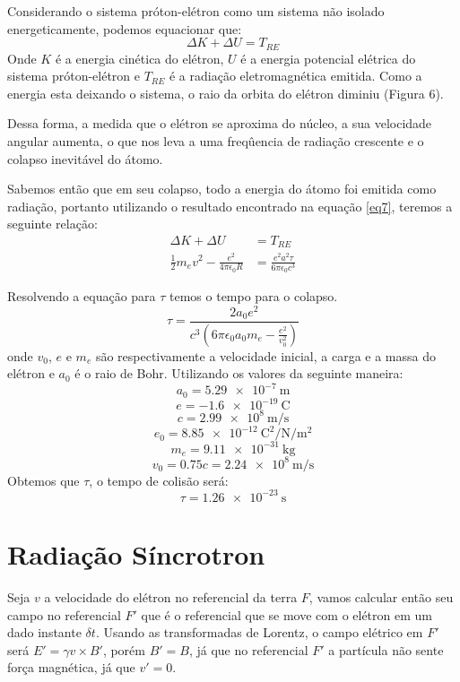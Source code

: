 \documentclass[12pt, letterpaper]{article}
\begin{document}
    Considerando o sistema próton-elétron como um sistema não isolado energeticamente, podemos equacionar que:
    \begin{equation} \label{eq10}
        \Delta K + \Delta U = T_{RE}
    \end{equation}
    Onde $K$ é a energia cinética do elétron, $U$ é a energia potencial elétrica do sistema próton-elétron e $T_{RE}$ é a radiação eletromagnética emitida. Como a energia esta deixando o sistema, o raio da orbita do elétron diminiu (Figura 6).

    Dessa forma, a medida que o elétron se aproxima do núcleo, a sua velocidade angular aumenta, o que nos leva a uma freqûencia de radiação crescente e o colapso inevitável do átomo.

    Sabemos então que em seu colapso, todo a energia do átomo foi emitida como radiação, portanto utilizando o resultado encontrado na equação \ref{eq7}, teremos a seguinte relação:
    \begin{equation} \label{eq11}
    \begin{split}
        \Delta K + \Delta U &= T_{RE} \\
        \frac{1}{2}m_e v^2 - \frac{e^2}{4\pi\epsilon_0R} &= \frac{e^2a^2\tau}{6\pi\epsilon_0c^3}
    \end{split}
    \end{equation}

    Resolvendo a equação para $\tau$ temos o tempo para o colapso.
    \begin{equation} \label{eq12}
        \tau = \frac{2a_0e^2}{c^3(6\pi\epsilon_0a_0m_e - \frac{e^2}{v_0^2})}
    \end{equation}
    onde $v_0$, $e$ e $m_e$ são respectivamente a velocidade inicial, a carga e a massa do elétron e $a_0$ é o raio de Bohr.
    Utilizando os valores da seguinte maneira:
    $$
    a_0 = \SI{5.29e-7}{\meter}
    $$$$
    e = \SI{-1.6e-19}{\coulomb}
    $$$$
    c = \SI{2.99e8}{\meter\per\second}
    $$$$
    e_0 = \SI{8.85e-12}{\coulomb\squared\per\newton\per\meter\squared}
    $$$$
    m_e = \SI{9.11e-31}{\kilogram}
    $$$$
    v_0 = 0.75c = \SI{2.24e8}{\meter\per\second}
    $$
    Obtemos que $\tau$, o tempo de colisão será:
    $$
    \tau = \SI{1.26e-23}{\second}
    $$

\newpage
\section{Radiação Síncrotron}

    Seja $v$ a velocidade do elétron no referencial da terra $F$, vamos calcular então seu campo no referencial $F'$ que é o referencial que se move com o elétron em um dado instante $\delta t$. Usando as transformadas de Lorentz, o campo elétrico em $F'$ será $E' = \gamma v\times B'$, porém $B' = B$, já que no referencial $F'$ a partícula não sente força magnética, já que $v' = 0$. 
\end{document}
